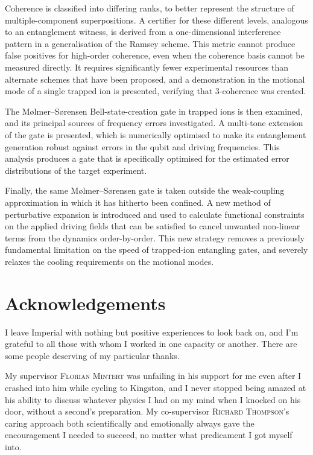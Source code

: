 \documentclass[a4paper,12pt,oneside,british]{scrbook}
\begin{document}
Coherence is classified into differing ranks, to better represent the structure of multiple-component superpositions.
A certifier for these different levels, analogous to an entanglement witness, is derived from a one-dimensional interference pattern in a generalisation of the Ramsey scheme.
This metric cannot produce false positives for high-order coherence, even when the coherence basis cannot be measured directly.
It requires significantly fewer experimental resources than alternate schemes that have been proposed, and a demonstration in the motional mode of a single trapped ion is presented, verifying that 3-coherence was created.

The M\o lmer--S\o rensen Bell-state-creation gate in trapped ions is then examined, and its principal sources of frequency errors investigated.
A multi-tone extension of the gate is presented, which is numerically optimised to make its entanglement generation robust against errors in the qubit and driving frequencies.
This analysis produces a gate that is specifically optimised for the estimated error distributions of the target experiment.

Finally, the same M\o lmer--S\o rensen gate is taken outside the weak-coupling approximation in which it has hitherto been confined.
A new method of perturbative expansion is introduced and used to calculate functional constraints on the applied driving fields that can be satisfied to cancel unwanted non-linear terms from the dynamics order-by-order.
This new strategy removes a previously fundamental limitation on the speed of trapped-ion entangling gates, and severely relaxes the cooling requirements on the motional modes.



\chapter*{Acknowledgements}

I leave Imperial with nothing but positive experiences to look back on, and I'm grateful to all those with whom I worked in one capacity or another.
There are some people deserving of my particular thanks.

My supervisor \textsc{Florian Mintert} was unfailing in his support for me even after I crashed into him while cycling to Kingston, and I never stopped being amazed at his ability to discuss whatever physics I had on my mind when I knocked on his door, without a second's preparation.
My co-supervisor \textsc{Richard Thompson}'s caring approach both scientifically and emotionally always gave the encouragement I needed to succeed, no matter what predicament I got myself into.
\end{document}
